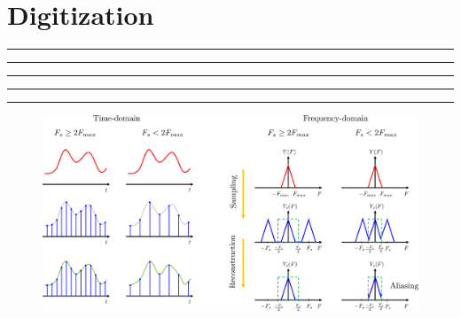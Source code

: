 \setcounter{chapter}{7}
\setcounter{section}{0}
\section{Digitization}
\vspace{-8pt} \hrule \hrule \hrule \hrule \hrule  \vspace{12pt}
	    \begin{figure}[!h]
	        \centering
	        \includegraphics[width=24cm]{./FIG_Franklin/fig8-smc4.png}
	    \end{figure}